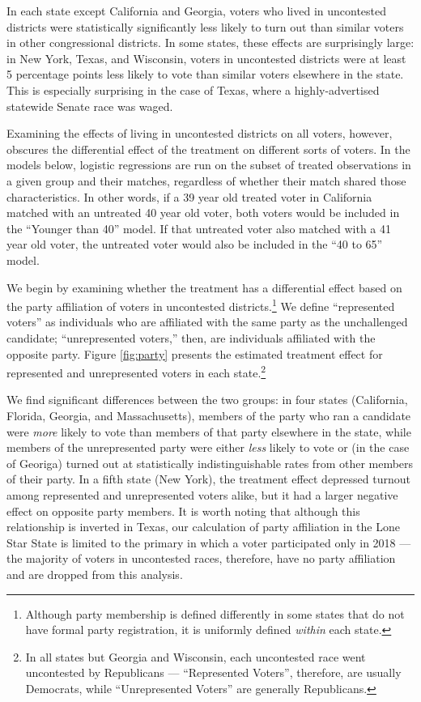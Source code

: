 \documentclass[
  12pt,
]{article}
\begin{document}
In each state except California and Georgia, voters who lived in uncontested districts were statistically significantly less likely to turn out than similar voters in other congressional districts. In some states, these effects are surprisingly large: in New York, Texas, and Wisconsin, voters in uncontested districts were at least 5 percentage points less likely to vote than similar voters elsewhere in the state. This is especially surprising in the case of Texas, where a highly-advertised statewide Senate race was waged.

Examining the effects of living in uncontested districts on all voters, however, obscures the differential effect of the treatment on different sorts of voters. In the models below, logistic regressions are run on the subset of treated observations in a given group and their matches, regardless of whether their match shared those characteristics. In other words, if a 39 year old treated voter in California matched with an untreated 40 year old voter, both voters would be included in the ``Younger than 40'' model. If that untreated voter also matched with a 41 year old voter, the untreated voter would also be included in the ``40 to 65'' model.

We begin by examining whether the treatment has a differential effect based on the party affiliation of voters in uncontested districts.\footnote{Although party membership is defined differently in some states that do not have formal party registration, it is uniformly defined \emph{within} each state.} We define ``represented voters'' as individuals who are affiliated with the same party as the unchallenged candidate; ``unrepresented voters,'' then, are individuals affiliated with the opposite party. Figure \ref{fig:party} presents the estimated treatment effect for represented and unrepresented voters in each state.\footnote{In all states but Georgia and Wisconsin, each uncontested race went uncontested by Republicans --- ``Represented Voters'', therefore, are usually Democrats, while ``Unrepresented Voters'' are generally Republicans.}

We find significant differences between the two groups: in four states (California, Florida, Georgia, and Massachusetts), members of the party who ran a candidate were \emph{more} likely to vote than members of that party elsewhere in the state, while members of the unrepresented party were either \emph{less} likely to vote or (in the case of Georiga) turned out at statistically indistinguishable rates from other members of their party. In a fifth state (New York), the treatment effect depressed turnout among represented and unrepresented voters alike, but it had a larger negative effect on opposite party members. It is worth noting that although this relationship is inverted in Texas, our calculation of party affiliation in the Lone Star State is limited to the primary in which a voter participated only in 2018 --- the majority of voters in uncontested races, therefore, have no party affiliation and are dropped from this analysis.
\end{document}
